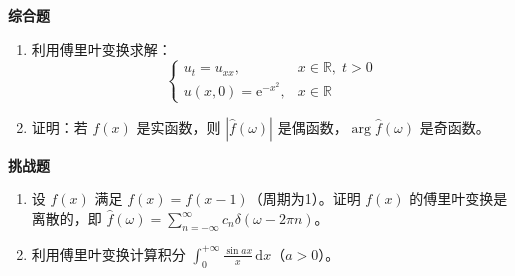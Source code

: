 \textbf{综合题}

\begin{enumerate}[resume]
    \item 利用傅里叶变换求解：
    \begin{equation}
        \begin{cases}
            u_t = u_{xx}, & x \in \mathbb{R}, \; t > 0 \\
            u(x, 0) = \mathrm{e}^{-x^2}, & x \in \mathbb{R}
        \end{cases}
    \end{equation}
    
    \item 证明：若 $f(x)$ 是实函数，则 $|\hat{f}(\omega)|$ 是偶函数，$\arg\hat{f}(\omega)$ 是奇函数。
\end{enumerate}

\textbf{挑战题}

\begin{enumerate}[resume]
    \item 设 $f(x)$ 满足 $f(x) = f(x-1)$（周期为1）。证明 $f(x)$ 的傅里叶变换是离散的，即 $\hat{f}(\omega) = \sum_{n=-\infty}^{\infty} c_n\delta(\omega - 2\pi n)$。
    
    \item 利用傅里叶变换计算积分 $\int_0^{+\infty} \frac{\sin ax}{x}\,\mathrm{d}x$（$a > 0$）。
\end{enumerate}
